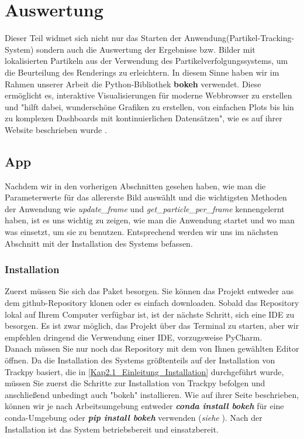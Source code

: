 \chapter{Auswertung \label{kap6}}
Dieser Teil widmet sich nicht nur das Starten der Anwendung(Partikel-Tracking-System) sondern auch die Auswertung der Ergebnisse bzw. Bilder mit lokalisierten Partikeln aus der Verwendung des Partikelverfolgungssystems, um die Beurteilung des Renderings zu erleichtern.
In diesem Sinne haben wir im Rahmen unserer Arbeit die Python-Bibliothek \textbf{bokeh} verwendet. Diese ermöglicht es, interaktive Visualisierungen für moderne Webbrowser zu erstellen und "hilft dabei, wunderschöne Grafiken zu erstellen, von einfachen Plots bis hin zu komplexen Dashboards mit kontinuierlichen Datensätzen", wie es auf ihrer Website beschrieben wurde \cite{bokeh}.

\section{App}
Nachdem wir in den vorherigen Abschnitten gesehen haben, wie man die Parameterwerte für das allererste Bild auswählt und die wichtigsten Methoden der Anwendung wie \textit{update\_frame} und \textit{get\_particle\_per\_frame} kennengelernt haben, ist es uns wichtig zu zeigen, wie man die Anwendung startet und wo man was einsetzt, um sie zu benutzen.
Entsprechend werden wir uns im nächsten Abschnitt mit der Installation des Systems befassen.

\subsection{Installation}
Zuerst müssen Sie sich das Paket besorgen. Sie können das Projekt entweder aus dem github-Repository \cite{particleTrackingSystem} klonen oder es einfach downloaden. Sobald das Repository lokal auf Ihrem Computer verfügbar ist, ist der nächste Schritt, sich eine IDE zu besorgen. Es ist zwar möglich, das Projekt über das Terminal zu starten, aber wir empfehlen dringend die Verwendung einer IDE, vorzugsweise PyCharm.\\
Danach müssen Sie nur noch das Repository mit dem von Ihnen gewählten Editor öffnen.  
Da die Installation des Systems größtenteils auf der Installation von Trackpy basiert, die in \ref{Kap2.1_Einleitung_Installation} durchgeführt wurde, müssen Sie zuerst die Schritte zur Installation von Trackpy befolgen und anschließend unbedingt auch "bokeh" installieren.   
Wie auf ihrer Seite beschrieben, können wir je nach Arbeitsumgebung entweder \textsl{\textbf{conda install bokeh}} für eine conda-Umgebung oder \textsl{\textbf{pip install bokeh}} verwenden (\textit{siehe} \cite{bokeh}).
Nach der Installation ist das System betriebsbereit und einsatzbereit.

